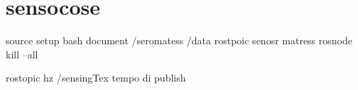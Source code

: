 \chapter{sensocose}
\newpage
source setup bash
document /seromatess /data 
rostpoic senosr matress
rosnode kill --all

rostopic hz /sensingTex
tempo di publish 